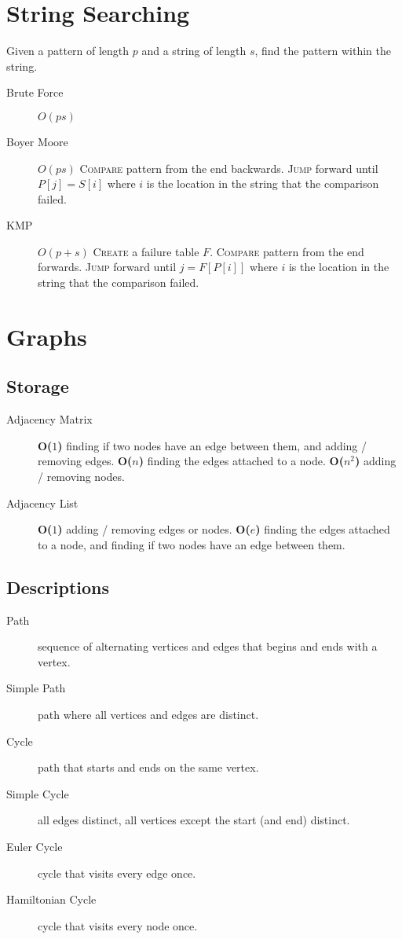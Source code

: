 \documentclass[landscape]{cheat}
\begin{document}
\begin{multicols}{3}
\section{String Searching}
Given a pattern of length $p$ and a string of length $s$, find the pattern within the string.
\begin{description}
    \item[Brute Force]
        $O(ps)$
    \item[Boyer Moore]
        $O(ps)$
        \textsc{Compare} pattern from the end backwards. 
        \textsc{Jump} forward until $P[j]=S[i]$ where $i$ is the location in the string that the comparison failed.
    \item[KMP]
        $O(p + s)$
        \textsc{Create} a failure table $F$.
        \textsc{Compare} pattern from the end forwards.
        \textsc{Jump} forward until $j=F[P[i]]$ where $i$ is the location in the string that the comparison failed.
\end{description}

\section{Graphs}

\subsection{Storage}
\begin{description}
    \item[Adjacency Matrix]
        \textbf{O($1$)} finding if two nodes have an edge between them, and adding / removing edges.
        \textbf{O($n$)} finding the edges attached to a node.
        \textbf{O($n^2$)} adding / removing nodes.
    \item[Adjacency List]
        \textbf{O($1$)} adding / removing edges or nodes.
        \textbf{O($e$)} finding the edges attached to a node, and finding if two nodes have an edge between them.
\end{description}

\subsection{Descriptions}
\begin{description}
    \item[Path] sequence of alternating vertices and edges that begins and ends with a vertex.
    \item[Simple Path] path where all vertices and edges are distinct.
    \item[Cycle] path that starts and ends on the same vertex.
    \item[Simple Cycle] all edges distinct, all vertices except the start (and end) distinct.
    \item[Euler Cycle] cycle that visits every edge once.
    \item[Hamiltonian Cycle] cycle that visits every node once.
\end{description}


\end{multicols}
\end{document}
